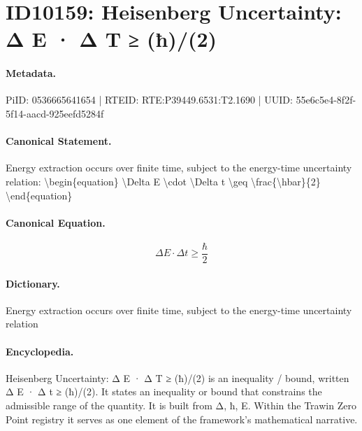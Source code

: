 \section*{ID10159: Heisenberg Uncertainty: Δ E · Δ T ≥ (ħ)/(2)}
\paragraph{Metadata.}
PiID: 0536665641654 | RTEID: RTE:P39449.6531:T2.1690 | UUID: 55e6c5e4-8f2f-5f14-aacd-925eefd5284f

\paragraph{Canonical Statement.}
Energy extraction occurs over finite time, subject to the energy-time uncertainty relation: \textbackslash{}begin\{equation\} \textbackslash{}Delta E \textbackslash{}cdot \textbackslash{}Delta t \textbackslash{}geq \textbackslash{}frac\{\textbackslash{}hbar\}\{2\} \textbackslash{}end\{equation\}

\paragraph{Canonical Equation.}
\[
\Delta E \cdot \Delta t \geq \frac{\hbar}{2}
\]

\paragraph{Dictionary.}
Energy extraction occurs over finite time, subject to the energy-time uncertainty relation

\paragraph{Encyclopedia.}
Heisenberg Uncertainty: Δ E · Δ T ≥ (ħ)/(2) is an inequality / bound, written Δ E · Δ t ≥ (ħ)/(2). It states an inequality or bound that constrains the admissible range of the quantity. It is built from Δ, ħ, E. Within the Trawin Zero Point registry it serves as one element of the framework's mathematical narrative.
